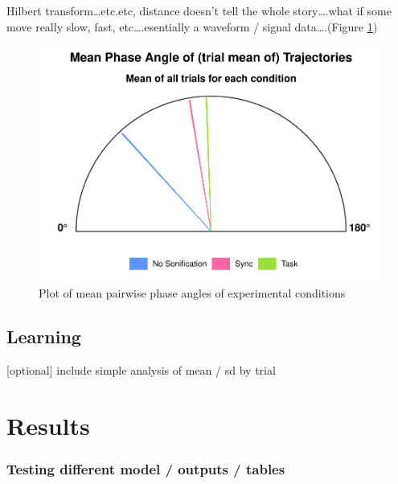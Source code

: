 \documentclass[10pt,a4paper,onecolumn]{article}
\begin{document}
Hilbert transform\ldots etc.etc, distance doesn't tell the whole story\ldots.what if some move really slow, fast, etc\ldots.esentially a waveform / signal data\ldots.(Figure \ref{fig:mean-instantaneous-phase-angle-circular-plot})

\begin{figure}

{\centering \includegraphics[width=1\linewidth]{CogSci_Bachelor_Thesis_files/figure-latex/mean-instantaneous-phase-angle-circular-plot-1} 

}

\caption{Plot of mean pairwise phase angles of experimental conditions}\label{fig:mean-instantaneous-phase-angle-circular-plot}
\end{figure}

\hypertarget{learning}{%
\subsection{Learning}\label{learning}}

{[}optional{]} include simple analysis of mean / sd by trial

\hypertarget{results}{%
\section{Results}\label{results}}

\hypertarget{testing-different-model-outputs-tables}{%
\subsubsection{Testing different model / outputs / tables}\label{testing-different-model-outputs-tables}}
\end{document}

